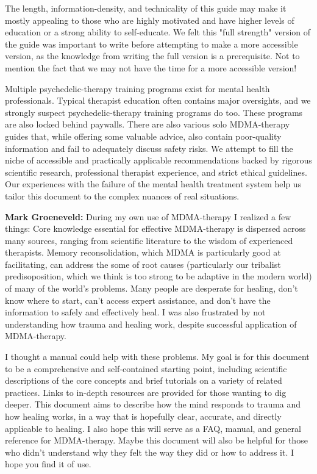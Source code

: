\documentclass[12pt,letterpaper]{article}
\begin{document}
The length, information-density, and technicality of this guide may make it mostly appealing to those who are highly motivated and have higher levels of education or a strong ability to self-educate. We felt this "full strength" version of the guide was important to write before attempting to make a more accessible version, as the knowledge from writing the full version is a prerequisite. Not to mention the fact that we may not have the time for a more accessible version!

Multiple psychedelic-therapy training programs exist for mental health professionals. Typical therapist education often contains major oversights, and we strongly suspect psychedelic-therapy training programs do too. These programs are also locked behind paywalls. There are also various solo MDMA-therapy guides that, while offering some valuable advice, also contain poor-quality information and fail to adequately discuss safety risks. We attempt to fill the niche of accessible and practically applicable recommendations backed by rigorous scientific research, professional therapist experience, and strict ethical guidelines. Our experiences with the failure of the mental health treatment system help us tailor this document to the complex nuances of real situations.


\textbf{Mark Groeneveld:} During my own use of MDMA-therapy I realized a few things: Core knowledge essential for effective MDMA-therapy is dispersed across many sources, ranging from scientific literature to the wisdom of experienced therapists. Memory reconsolidation, which MDMA is particularly good at facilitating, can address the some of root causes (particularly our tribalist predisoposition, which we think is too strong to be adaptive in the modern world) of many of the world's problems. Many people are desperate for healing, don't know where to start, can't access expert assistance, and don't have the information to safely and effectively heal. I was also frustrated by not understanding how trauma and healing work, despite successful application of MDMA-therapy.

I thought a manual could help with these problems. My goal is for this document to be a comprehensive and self-contained starting point, including scientific descriptions of the core concepts and brief tutorials on a variety of related practices. Links to in-depth resources are provided for those wanting to dig deeper. This document aims to describe how the mind responds to trauma and how healing works, in a way that is hopefully clear, accurate, and directly applicable to healing. I also hope this will serve as a FAQ, manual, and general reference for MDMA-therapy. Maybe this document will also be helpful for those who didn't understand why they felt the way they did or how to address it. I hope you find it of use.
\end{document}
